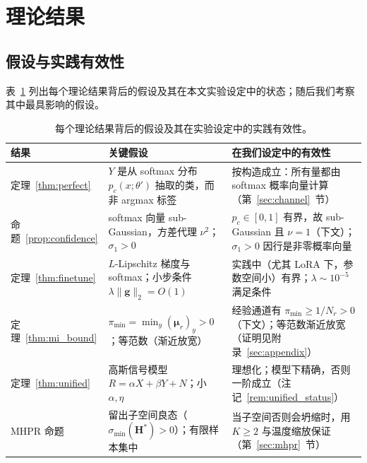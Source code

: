 \documentclass[11pt,a4paper]{article}
\begin{document}
\section{理论结果}
\label{sec:theory}

\subsection{假设与实践有效性}
\label{sec:assumptions}

表~\ref{tab:assumptions} 列出每个理论结果背后的假设及其在本文实验设定中的状态；随后我们考察其中最具影响的假设。

\begin{table}[t]
\centering
\footnotesize
\caption{每个理论结果背后的假设及其在实验设定中的实践有效性。}\label{tab:assumptions}
\setlength{\tabcolsep}{2pt}
\begin{tabular}{p{2.0cm} p{4.9cm} p{4.8cm}}
\toprule
结果 & 关键假设 & 在我们设定中的有效性 \\
\midrule
定理~\ref{thm:perfect} & $Y$ 是从 softmax 分布 $p_c(x;\theta')$ 抽取的类，而非 argmax 标签 & 按构造成立：所有量都由 softmax 概率向量计算（第~\ref{sec:channel}~节） \\
命题~\ref{prop:confidence} & softmax 向量 sub-Gaussian，方差代理 $\nu^2$；$\sigma_1>0$ & $p_c\in[0,1]$ 有界，故 sub-Gaussian 且 $\nu=1$（下文）；$\sigma_1>0$ 因行是非零概率向量 \\
定理~\ref{thm:finetune} & $L$-Lipschitz 梯度与 softmax；小步条件 $\lambda\|\mathbf{g}\|_2=O(1)$ & 实践中（尤其 LoRA 下，参数空间小）有界；$\lambda{\sim}10^{-5}$ 满足条件 \\
定理~\ref{thm:mi_bound} & $\pi_{\min}=\min_y(\boldsymbol{\mu}_r)_y>0$；等范数（渐近放宽） & 经验通道有 $\pi_{\min}\ge 1/N_r>0$（下文）；等范数渐近放宽（证明见附录~\ref{sec:appendix}） \\
定理~\ref{thm:unified} & 高斯信号模型 $R=\alpha X+\beta Y+N$；小 $\alpha,\eta$ & 理想化；模型下精确，否则一阶成立（注记~\ref{rem:unified_status}） \\
MHPR 命题 & 留出子空间良态（$\sigma_{\min}(\mathbf{H}^*)>0$）；有限样本集中 & 当子空间否则会坍缩时，用 $K\ge2$ 与温度缩放保证（第~\ref{sec:mhpr}~节） \\
\bottomrule
\end{tabular}
\end{table}
\end{document}
